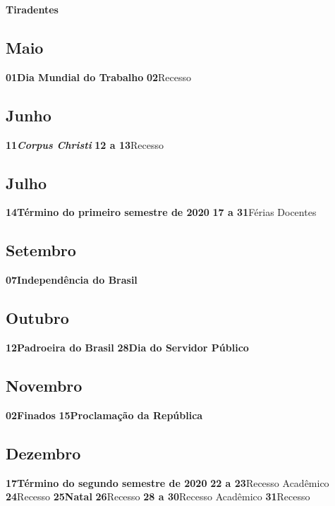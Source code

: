 \documentclass[thesis]{hmcposter}
\begin{document}
\begin{poster}
\textbf{Tiradentes} \newline\subsection{Maio}\textbf{01}\quad \quad \quad \quad \textbf{Dia Mundial do Trabalho} \newline\textbf{02}\quad \quad \quad \quad Recesso \newline\subsection{Junho}\textbf{11}\quad \quad \quad \quad \textbf{\textit{Corpus Christi}} \newline\textbf{12 a 13}\quad \quad Recesso \newline\subsection{Julho}\textbf{14}\quad \quad \quad \quad \textbf{Término do primeiro semestre de 2020} \newline\textbf{17 a 31}\quad \quad Férias Docentes \newline\subsection{Setembro}\textbf{07}\quad \quad \quad \quad \textbf{Independência do Brasil} \newline\subsection{Outubro}\textbf{12}\quad \quad \quad \quad \textbf{Padroeira do Brasil} \newline\textbf{28}\quad \quad \quad \quad \textbf{Dia do Servidor Público} \newline\subsection{Novembro}\textbf{02}\quad \quad \quad \quad \textbf{Finados} \newline\textbf{15}\quad \quad \quad \quad \textbf{Proclamação da República} \newline\subsection{Dezembro}\textbf{17}\quad \quad \quad \quad \textbf{Término do segundo semestre de 2020} \newline\textbf{22 a 23}\quad \quad Recesso Acadêmico \newline\textbf{24}\quad \quad \quad \quad Recesso \newline\textbf{25}\quad \quad \quad \quad \textbf{Natal} \newline\textbf{26}\quad \quad \quad \quad Recesso \newline\textbf{28 a 30}\quad \quad Recesso Acadêmico \newline\textbf{31}\quad \quad \quad \quad Recesso \newline\newpage

\end{poster}
\end{document}
